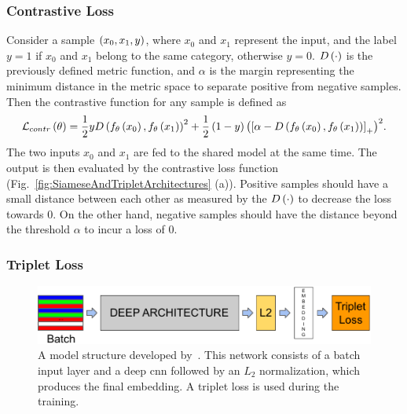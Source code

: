 \subsubsection{Contrastive Loss}

Consider a sample $\left( {x_0, x_1, y} \right)$, where $x_0$ and $x_1$ represent the input, and the label $y = 1$ if $x_0$ and $x_1$ belong to the same category, otherwise $y = 0$. ${D} \left( \cdot \right)$ is the previously defined metric function, and $\alpha$ is the margin representing the minimum distance in the metric space to separate positive from negative samples. Then the contrastive function for any sample is defined as~\cite{hadsell2006dimreduction}
\begin{equation}
    \label{eq:ContrastiveLoss}
    {\mathcal{L}_{contr}} \left( \theta \right) = 
    \frac{1}{2}y
    {{D} \left( {f_\theta} \left( x_0 \right), {f_\theta} \left( x_1 \right) \right)}^2 +
    \frac{1}{2}
    \left( {1 - y} \right) {\left( {
    \left[ {\alpha - {D} \left( {f_\theta} \left( x_0 \right), {f_\theta} \left( x_1 \right) \right)} \right]_{+}} \right)}^2.
\end{equation}
The two inputs $x_0$ and $x_1$ are fed to the shared model at the same time. The output is then evaluated by the contrastive loss function (Fig.~\ref{fig:SiameseAndTripletArchitectures} (a)). Positive samples should have a small distance between each other as measured by the ${D} \left( \cdot \right)$ to decrease the loss towards $0$. On the other hand, negative samples should have the distance beyond the threshold $\alpha$ to incur a loss of $0$.

\subsubsection{Triplet Loss}

\begin{figure}[t]
    \centerline{\includegraphics[width=0.8\linewidth]{figures/theoretical_foundations/triplet_loss_model_structure.pdf}}
    \caption[Triplet loss architecture]{A model structure developed by~\cite{schroff2015facenet}. This network consists of a batch input layer and a deep \gls{cnn} followed by an $L_2$ normalization, which produces the final embedding. A triplet loss is used during the training. }
    \label{fig:TripletLossModelStructure}
\end{figure}

